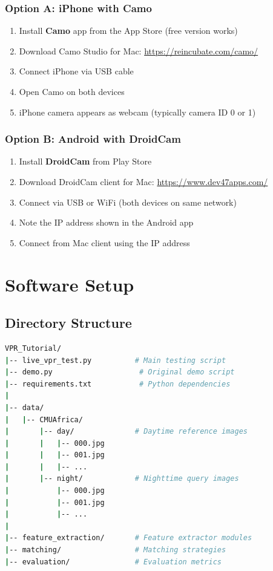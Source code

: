 \documentclass[11pt,a4paper]{article}
\begin{document}
\subsubsection{Option A: iPhone with Camo}
\begin{enumerate}
    \item Install \textbf{Camo} app from the App Store (free version works)
    \item Download Camo Studio for Mac: \url{https://reincubate.com/camo/}
    \item Connect iPhone via USB cable
    \item Open Camo on both devices
    \item iPhone camera appears as webcam (typically camera ID 0 or 1)
\end{enumerate}

\subsubsection{Option B: Android with DroidCam}
\begin{enumerate}
    \item Install \textbf{DroidCam} from Play Store
    \item Download DroidCam client for Mac: \url{https://www.dev47apps.com/}
    \item Connect via USB or WiFi (both devices on same network)
    \item Note the IP address shown in the Android app
    \item Connect from Mac client using the IP address
\end{enumerate}

\newpage
\section{Software Setup}

\subsection{Directory Structure}

\begin{lstlisting}[language=bash, caption=Required directory structure]
VPR_Tutorial/
|-- live_vpr_test.py          # Main testing script
|-- demo.py                    # Original demo script
|-- requirements.txt           # Python dependencies
|
|-- data/
|   |-- CMUAfrica/
|       |-- day/              # Daytime reference images
|       |   |-- 000.jpg
|       |   |-- 001.jpg
|       |   |-- ...
|       |-- night/            # Nighttime query images
|           |-- 000.jpg
|           |-- 001.jpg
|           |-- ...
|
|-- feature_extraction/       # Feature extractor modules
|-- matching/                 # Matching strategies
|-- evaluation/               # Evaluation metrics
\end{lstlisting}
\end{document}
